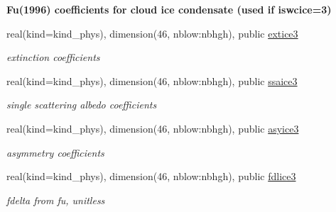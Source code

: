 \begin{Indent}\textbf{ Fu(1996) coefficients for cloud ice condensate (used if iswcice=3)}\par
\begin{DoxyCompactItemize}
\item 
\mbox{\label{namespacemodule__radsw__cldprtb_a8b8bae831aa5b460e260c94e7f24f4c7}} 
real(kind=kind\+\_\+phys), dimension(46, nblow\+:nbhgh), public \hyperlink{namespacemodule__radsw__cldprtb_a8b8bae831aa5b460e260c94e7f24f4c7}{extice3}
\begin{DoxyCompactList}\small\item\em extinction coefficients \end{DoxyCompactList}\item 
\mbox{\label{namespacemodule__radsw__cldprtb_a39b045b05e6bc9c04603277654ff8fc6}} 
real(kind=kind\+\_\+phys), dimension(46, nblow\+:nbhgh), public \hyperlink{namespacemodule__radsw__cldprtb_a39b045b05e6bc9c04603277654ff8fc6}{ssaice3}
\begin{DoxyCompactList}\small\item\em single scattering albedo coefficients \end{DoxyCompactList}\item 
\mbox{\label{namespacemodule__radsw__cldprtb_aec2685be0de3a557aca169062cf1055e}} 
real(kind=kind\+\_\+phys), dimension(46, nblow\+:nbhgh), public \hyperlink{namespacemodule__radsw__cldprtb_aec2685be0de3a557aca169062cf1055e}{asyice3}
\begin{DoxyCompactList}\small\item\em asymmetry coefficients \end{DoxyCompactList}\item 
\mbox{\label{namespacemodule__radsw__cldprtb_aa42cf6596d2dcd887864b1de40da3293}} 
real(kind=kind\+\_\+phys), dimension(46, nblow\+:nbhgh), public \hyperlink{namespacemodule__radsw__cldprtb_aa42cf6596d2dcd887864b1de40da3293}{fdlice3}
\begin{DoxyCompactList}\small\item\em fdelta from fu, unitless \end{DoxyCompactList}\end{DoxyCompactItemize}
\end{Indent}
